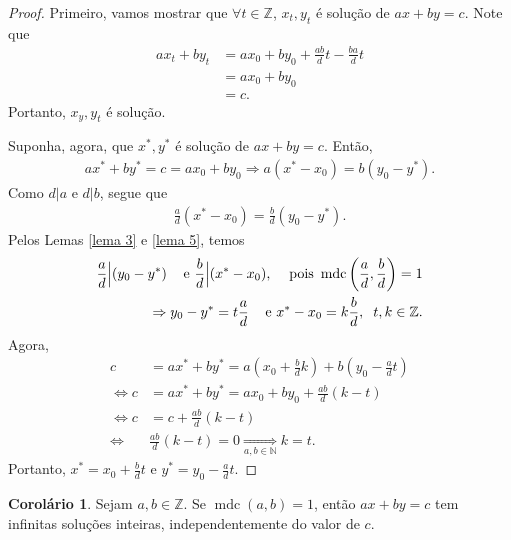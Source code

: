 \documentclass[a4paper,11pt,twoside, leqno]{article}
\DeclareMathOperator{\mdc}{mdc}
\theoremstyle{definition}
\newtheorem{corollary}{Corolário}[theorem]
\begin{document}
\begin{proof}
	Primeiro, vamos mostrar que $\forall t\in\mathbb{Z}$, $x_t, y_t$ é solução de $ax + by = c$. Note que 
	\begin{align*}
	ax_t + by_t &= ax_0 + by_0 + \frac{ab}{d}t - \frac{ba}{d}t \\
	&= ax_0 + by_0 \\
	&= c.
	\end{align*}
	Portanto, $x_y, y_t$ é solução.
	
	Suponha, agora, que $x^\ast, y^\ast$ é solução de $ax + by = c$. Então, 
	\begin{align*}
	ax^\ast + by^\ast = c = ax_0 + by_0 \Rightarrow a(x^\ast - x_0) = b(y_0 - y^\ast).
	\end{align*}
	Como $d|a$ e $d|b$, segue que 
	\begin{align*}
	\frac{a}{d}(x^\ast - x_0) = \frac{b}{d}(y_0 - y^\ast).
	\end{align*}
	Pelos Lemas \eqref{lema 3} e \eqref{lema 5}, temos
	\begin{align*}
	\frac{a}{d}\Big| (y_0 - y^\ast) \hspace{0.3cm} \text{ e } \frac{b}{d}\Big| (x^\ast - x_0), \hspace{0.3cm} \text{ pois } \mdc\left( \frac{a}{d}, \frac{b}{d} \right) = 1 \\
	\Rightarrow y_0 - y^\ast = t\frac{a}{d} \hspace{0.3cm} \text{ e } x^\ast - x_0 = k\frac{b}{d}, \hspace{0.2cm} t,k\in\mathbb{Z}.
	\end{align*}
	Agora, 
	\begin{align*}
	c &= ax^\ast + by^\ast = a\left( x_0 + \frac{b}{d}k \right) + b\left( y_0 - \frac{a}{d}t \right) \\
	\Leftrightarrow c &= ax^\ast + by^\ast = ax_0 + by_0 + \frac{ab}{d}(k-t) \\
	\Leftrightarrow c &= c + \frac{ab}{d}(k-t) \\
	\Leftrightarrow &\frac{ab}{d}(k-t) = 0 \underset{a,b\in\mathbb{N}}{\Rightarrow} k = t.
	\end{align*}
	Portanto, $x^\ast = x_0 + \displaystyle{ \frac{b}{d}t }$ e $y^\ast = y_0 - \displaystyle{ \frac{a}{d}t }$.
\end{proof}
\begin{corollary}
	Sejam $a,b\in\mathbb{Z}$. Se $\mdc(a,b) = 1$, então $ax + by = c$ tem infinitas soluções inteiras, independentemente do valor de $c$.
\end{corollary}
\end{document}
